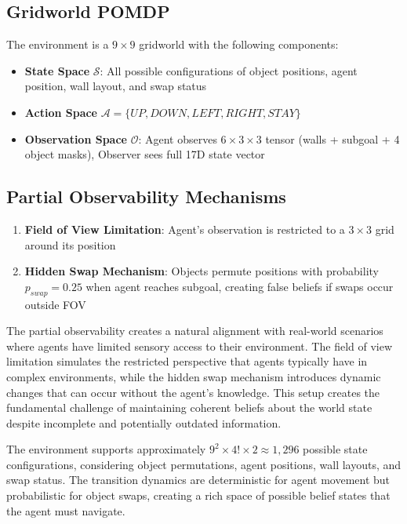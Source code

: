 \documentclass[11pt]{article}
\begin{document}
\subsection{Gridworld POMDP}
The environment is a $9 \times 9$ gridworld with the following components:
\begin{itemize}
    \item \textbf{State Space} $\mathcal{S}$: All possible configurations of object positions, agent position, wall layout, and swap status
    \item \textbf{Action Space} $\mathcal{A} = \{UP, DOWN, LEFT, RIGHT, STAY\}$
    \item \textbf{Observation Space} $\mathcal{O}$: Agent observes $6 \times 3 \times 3$ tensor (walls + subgoal + 4 object masks), Observer sees full 17D state vector
\end{itemize}

\subsection{Partial Observability Mechanisms}
\begin{enumerate}
    \item \textbf{Field of View Limitation}: Agent's observation is restricted to a $3 \times 3$ grid around its position
    \item \textbf{Hidden Swap Mechanism}: Objects permute positions with probability $p_{swap} = 0.25$ when agent reaches subgoal, creating false beliefs if swaps occur outside FOV
\end{enumerate}

The partial observability creates a natural alignment with real-world scenarios where agents have limited sensory access to their environment. The field of view limitation simulates the restricted perspective that agents typically have in complex environments, while the hidden swap mechanism introduces dynamic changes that can occur without the agent's knowledge. This setup creates the fundamental challenge of maintaining coherent beliefs about the world state despite incomplete and potentially outdated information.

The environment supports approximately $9^2 \times 4! \times 2 \approx 1,296$ possible state configurations, considering object permutations, agent positions, wall layouts, and swap status. The transition dynamics are deterministic for agent movement but probabilistic for object swaps, creating a rich space of possible belief states that the agent must navigate.
\end{document}
